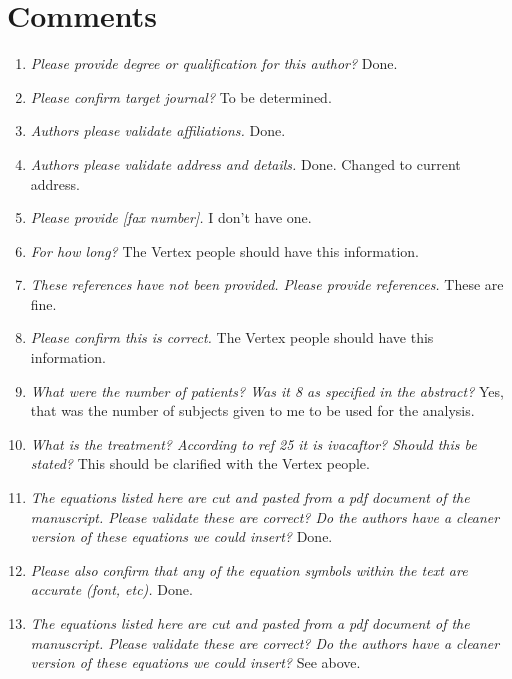 \documentclass[11pt,]{article}
\title{}
\author{}
\date{}
\providecommand{\tightlist}{%
  \setlength{\itemsep}{0pt}\setlength{\parskip}{0pt}}
\begin{document}
\maketitle


\section{Comments}\label{comments}

\begin{enumerate}
\def\labelenumi{\arabic{enumi}.}
\tightlist
\item
  \emph{Please provide degree or qualification for this author?} Done.
\item
  \emph{Please confirm target journal?} To be determined.
\item
  \emph{Authors please validate affiliations.} Done.
\item
  \emph{Authors please validate address and details.} Done. Changed to
  current address.
\item
  \emph{Please provide {[}fax number{]}.} I don't have one.
\item
  \emph{For how long?} The Vertex people should have this information.
\item
  \emph{These references have not been provided. Please provide
  references.} These are fine.
\item
  \emph{Please confirm this is correct.} The Vertex people should have
  this information.
\item
  \emph{What were the number of patients? Was it 8 as specified in the
  abstract?} Yes, that was the number of subjects given to me to be used
  for the analysis.
\item
  \emph{What is the treatment? According to ref 25 it is ivacaftor?
  Should this be stated?} This should be clarified with the Vertex
  people.
\item
  \emph{The equations listed here are cut and pasted from a pdf document
  of the manuscript. Please validate these are correct? Do the authors
  have a cleaner version of these equations we could insert?} Done.
\item
  \emph{Please also confirm that any of the equation symbols within the
  text are accurate (font, etc).} Done.
\item
  \emph{The equations listed here are cut and pasted from a pdf document
  of the manuscript. Please validate these are correct? Do the authors
  have a cleaner version of these equations we could insert?} See above.

\end{enumerate}
\end{document}
